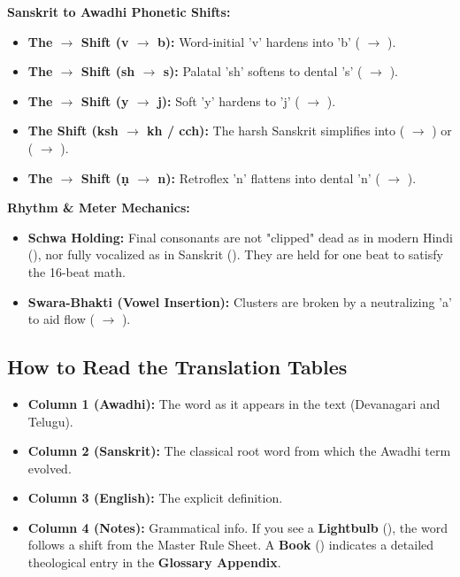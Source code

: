 \begin{tcolorbox}[gotchabox, title=Master Linguistic Rule Sheet]
\textbf{Sanskrit to Awadhi Phonetic Shifts:}
\begin{itemize}
    \item \textbf{The  $\rightarrow$  Shift (v $\rightarrow$ b):} Word-initial 'v' hardens into 'b' ( $\rightarrow$ ).
    \item \textbf{The  $\rightarrow$  Shift (sh $\rightarrow$ s):} Palatal 'sh' softens to dental 's' ( $\rightarrow$ ).
    \item \textbf{The  $\rightarrow$  Shift (y $\rightarrow$ j):} Soft 'y' hardens to 'j' ( $\rightarrow$ ).
    \item \textbf{The  Shift (ksh $\rightarrow$ kh / cch):} The harsh Sanskrit  simplifies into  ( $\rightarrow$ ) or  ( $\rightarrow$ ).
    \item \textbf{The  $\rightarrow$  Shift (ṇ $\rightarrow$ n):} Retroflex 'n' flattens into dental 'n' ( $\rightarrow$ ).
\end{itemize}

\textbf{Rhythm \& Meter Mechanics:}
\begin{itemize}
    \item \textbf{Schwa Holding:} Final consonants are not "clipped" dead as in modern Hindi (), nor fully vocalized as in Sanskrit (). They are held for one beat to satisfy the 16-beat math.
    \item \textbf{Swara-Bhakti (Vowel Insertion):} Clusters are broken by a neutralizing 'a' to aid flow ( $\rightarrow$ ).
\end{itemize}
\end{tcolorbox}

\subsection*{How to Read the Translation Tables}
\begin{itemize}
    \item \textbf{Column 1 (Awadhi):} The word as it appears in the text (Devanagari and Telugu). 
    \item \textbf{Column 2 (Sanskrit):} The classical root word from which the Awadhi term evolved.
    \item \textbf{Column 3 (English):} The explicit definition.
    \item \textbf{Column 4 (Notes):} Grammatical info. If you see a \textbf{Lightbulb} (\gotchaicon), the word follows a shift from the Master Rule Sheet. A \textbf{Book} (\glossaryicon) indicates a detailed theological entry in the \textbf{Glossary Appendix}.
\end{itemize}

